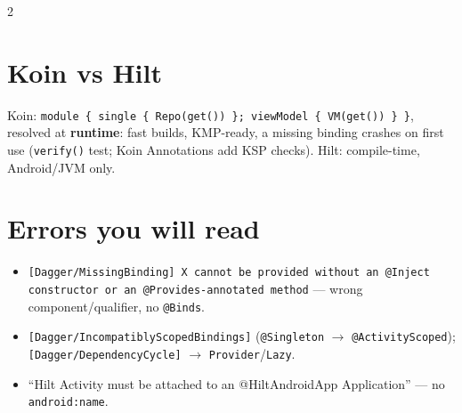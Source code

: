 \documentclass[8pt]{extarticle}
\begin{document}
\begin{multicols}{2}
\section{Koin vs Hilt}
\raggedright Koin: \texttt{module \{ single \{ Repo(get()) \}; viewModel \{ VM(get()) \} \}},
resolved at \textbf{runtime}: fast builds, KMP-ready, a missing binding crashes on first use
(\texttt{verify()} test; Koin Annotations add KSP checks). Hilt: compile-time, Android/JVM only.

\section{Errors you will read}
\begin{itemize}\raggedright
  \item \texttt{[Dagger/MissingBinding] X cannot be provided without an @Inject constructor or an
        @Provides-annotated method} — wrong component/qualifier, no \texttt{@Binds}.
  \item \texttt{[Dagger/IncompatiblyScopedBindings]} (\texttt{@Singleton} $\to$
        \texttt{@ActivityScoped}); \texttt{[Dagger/DependencyCycle]} $\to$ \texttt{Provider}/\texttt{Lazy}.
  \item ``Hilt Activity must be attached to an @HiltAndroidApp Application'' — no
        \texttt{android:name}.
\end{itemize}


\end{multicols}

\end{document}
